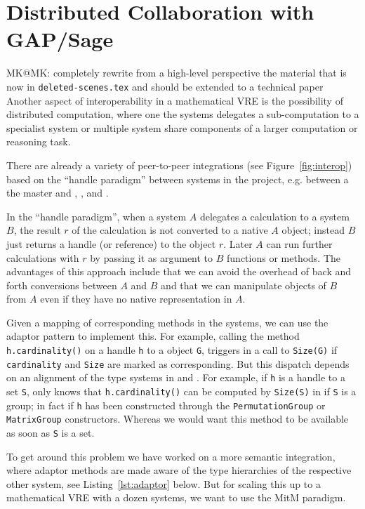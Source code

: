 \section{Distributed Collaboration with GAP/Sage}\label{sec:gapsage}
\begin{newpart}{MK@MK: completely rewrite from a high-level perspective the material that
    is now in \texttt{deleted-scenes.tex} and should be extended to a technical paper}
Another aspect of interoperability in a mathematical VRE is the possibility of distributed
computation, where one the systems delegates a sub-computation to a specialist system or
multiple system share components of a larger computation or reasoning task.

There are already a variety of peer-to-peer integrations (see Figure~\ref{fig:interop})
based on the ``handle paradigm'' between systems in the \ODK project, e.g. between \Sage a
the master and \GAP, \Singular, and \Pari. 

In the ``handle paradigm'', when a system $A$ delegates a calculation to a system $B$, the
result $r$ of the calculation is not converted to a native $A$ object; instead $B$ just
returns a handle (or reference) to the object $r$. Later $A$ can run further calculations
with $r$ by passing it as argument to $B$ functions or methods. The advantages of this
approach include that we can avoid the overhead of back and forth conversions between $A$
and $B$ and that we can manipulate objects of $B$ from $A$ even if they have no native
representation in $A$.

Given a mapping of corresponding methods in the systems, we can use the adaptor pattern to
implement this. For example, calling the method \texttt{h.cardinality()} on a \Sage handle
\texttt{h} to a \GAP object \texttt{G}, triggers in \GAP a call to \texttt{Size(G)} if
\texttt{cardinality} and \texttt{Size} are marked as corresponding. But this dispatch
depends on an alignment of the type systems in \Sage and \GAP. For example, if \texttt{h}
is a handle to a set \texttt{S}, \Sage only knows that \texttt{h.cardinality()} can be
computed by \texttt{Size(S)} in \GAP if \texttt{S} is a group; in fact if \texttt{h} has
been constructed through the \texttt{PermutationGroup} or \texttt{MatrixGroup}
constructors. Whereas we would want this method to be available as soon as \texttt{S} is a
set.

To get around this problem we have worked on a more semantic integration, where adaptor
methods are made aware of the type hierarchies of the respective other system, see
Listing~\ref{lst:adaptor} below. But for scaling this up to a mathematical VRE with a
dozen systems, we want to use the MitM paradigm.
 

\end{newpart}
